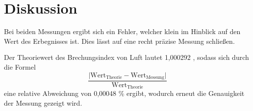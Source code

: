 \section{Diskussion}
\label{sec:Diskussion}
Bei beiden Messungen ergibt sich ein Fehler, welcher klein im Hinblick
auf den Wert des Erbegnisses ist. Dies lässt auf eine recht präzise Messung schließen.

\noindent Der Theoriewert des Brechungsindex von Luft lautet 1,000292 \cite{chemie},
sodass sich durch die Formel
\begin{equation*}
  \frac{\lvert \text{Wert}_{\text{Theorie}}-\text{Wert}_{\text{Messung}}\rvert}{\text{Wert}_{\text{Theorie}}}
\end{equation*}
eine relative Abweichung von 0,00048 \% ergibt, wodurch erneut die Genauigkeit der Messung gezeigt wird.
